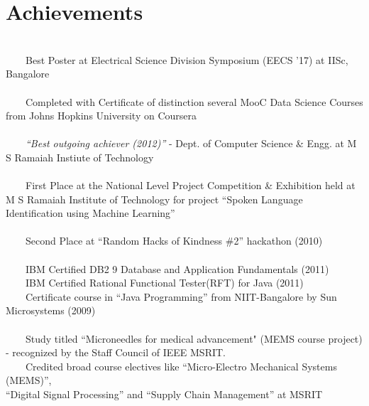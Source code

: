 \documentclass[a4paper,10pt]{article} %
\newcommand{\tabitem}{~~\llap{\textbullet}~~}
\begin{document}
\section{Achievements}
~\\
\tabitem Best Poster at Electrical Science Division Symposium (EECS '17) at IISc, Bangalore \\
\\
\tabitem Completed with Certificate of distinction several MooC Data Science Courses from Johns Hopkins University on Coursera\\
\\
\tabitem \textit{``Best outgoing achiever (2012)”} - Dept. of Computer Science \& Engg. at M S Ramaiah Instiute of Technology \\
\\
\tabitem First Place at the National Level Project Competition \& Exhibition held at M S Ramaiah Institute of Technology for project “Spoken Language Identification using Machine Learning”\\
\\
\tabitem Second Place at “Random Hacks of Kindness \#2” hackathon (2010)\\
\\
\tabitem IBM Certified DB2 9 Database and Application Fundamentals (2011)\\
\tabitem IBM Certified Rational Functional Tester(RFT) for Java (2011)\\
\tabitem Certificate course in “Java Programming” from NIIT-Bangalore by Sun Microsystems (2009)\\
\\
\tabitem Study titled ``Microneedles for medical advancement" (MEMS course project) - recognized by the Staff Council of IEEE MSRIT.\\
\tabitem Credited broad course electives like “Micro-Electro Mechanical Systems (MEMS)”, \\“Digital Signal Processing” and “Supply Chain Management” at MSRIT \\

\end{document}
